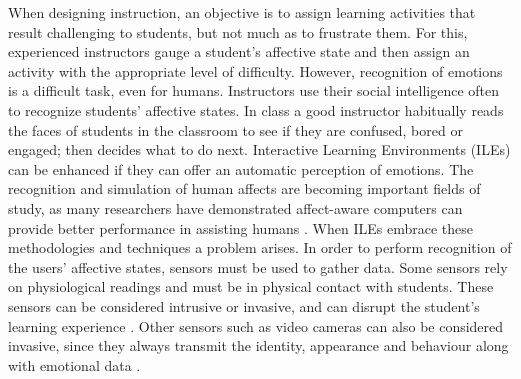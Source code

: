 \documentclass[conference]{IEEEtran}
\begin{document}
When designing instruction, an objective is to assign learning activities
that result challenging to students, but not much as to frustrate them. For
this, experienced instructors gauge a student’s affective state and then assign
an activity with the appropriate level of difficulty. However, recognition of 
emotions is a difficult task, even
for humans. Instructors use their social intelligence often to recognize
students’ affective states. In class a good instructor habitually reads the
faces of students in the classroom to see if they are confused, bored or
engaged; then decides what to do next. Interactive Learning Environments (ILEs)
can be enhanced if they can offer an
automatic perception of emotions. The recognition and simulation of human
affects are becoming important fields of study, as many researchers have
demonstrated affect-aware computers can provide better performance in assisting
humans \cite{picard2001toward}. When ILEs embrace these methodologies and techniques a
problem arises. In order to perform recognition of the users' affective states,
sensors must be used to gather data. Some sensors rely on physiological readings
and must be in physical contact with students. These sensors can be considered
intrusive or invasive, and can disrupt the student’s learning experience 
\cite{zhai2008stress,sidney2005integrating,arroyo2009emotion}.
Other sensors such as video cameras can also be considered invasive, since they always transmit the
identity, appearance and behaviour along with emotional data \cite{picard2001toward}.
\end{document}

